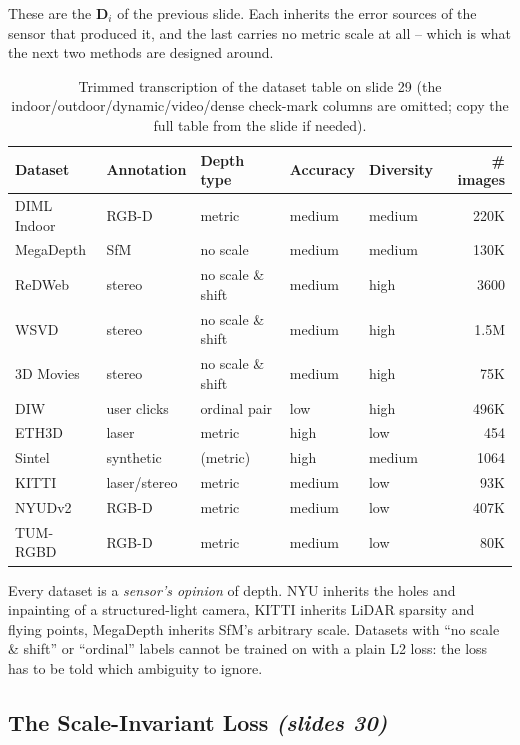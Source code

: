 \documentclass[11pt,a4paper]{article}
\numberwithin{equation}{section}
\newcommand{\slides}[1]{\texorpdfstring{\;\emph{(slides #1)}}{ (slides #1)}}
\theoremstyle{plain}
\theoremstyle{definition}
\begin{document}
These are the $\bm D_i$ of the previous slide. Each inherits the error sources of the sensor that produced it, and the last carries no metric scale at all -- which is what the next two methods are designed around.
 
\begin{table}[htbp]
\centering\footnotesize
\begin{tabular}{lllllr}
\toprule
Dataset & Annotation & Depth type & Accuracy & Diversity & \# images\\
\midrule
DIML Indoor & RGB-D & metric & medium & medium & 220K\\
MegaDepth & SfM & no scale & medium & medium & 130K\\
ReDWeb & stereo & no scale \& shift & medium & high & 3600\\
WSVD & stereo & no scale \& shift & medium & high & 1.5M\\
3D Movies & stereo & no scale \& shift & medium & high & 75K\\
DIW & user clicks & ordinal pair & low & high & 496K\\
ETH3D & laser & metric & high & low & 454\\
Sintel & synthetic & (metric) & high & medium & 1064\\
KITTI & laser/stereo & metric & medium & low & 93K\\
NYUDv2 & RGB-D & metric & medium & low & 407K\\
TUM-RGBD & RGB-D & metric & medium & low & 80K\\
\bottomrule
\end{tabular}
\caption{Trimmed transcription of the dataset table on slide 29 (the indoor/outdoor/dynamic/video/dense check-mark columns are omitted; copy the full table from the slide if needed).}
\end{table}
 
\begin{intuition}
Every dataset is a \emph{sensor's opinion} of depth. NYU inherits the holes and inpainting of a structured-light camera, KITTI inherits LiDAR sparsity and flying points, MegaDepth inherits SfM's arbitrary scale. Datasets with ``no scale \& shift'' or ``ordinal'' labels cannot be trained on with a plain L2 loss: the loss has to be told which ambiguity to ignore.
\end{intuition}
 
\subsection{The Scale-Invariant Loss \slides{30}}
 
\end{document}
